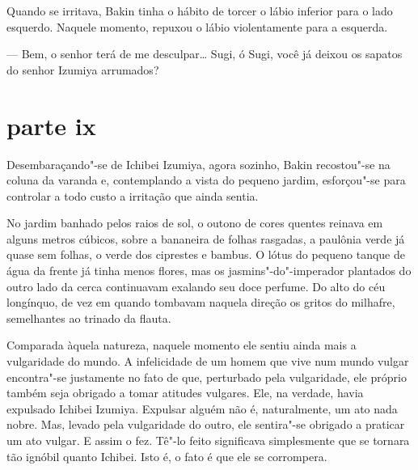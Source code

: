 Quando se irritava, Bakin tinha o hábito de torcer o lábio inferior para
o lado esquerdo. Naquele momento, repuxou o lábio violentamente para a
esquerda.

--- Bem, o senhor terá de me desculpar\ldots{} Sugi, ó Sugi, você já deixou
os sapatos do senhor Izumiya arrumados?

\section*{parte ix}

Desembaraçando"-se de Ichibei Izumiya, agora sozinho, Bakin recostou"-se
na coluna da varanda e, contemplando a vista do pequeno jardim,
esforçou"-se para controlar a todo custo a irritação que ainda sentia.

No jardim banhado pelos raios de sol, o outono de cores quentes reinava
em alguns metros cúbicos, sobre a bananeira de folhas rasgadas, a
paulônia verde já quase sem folhas, o verde dos ciprestes e bambus. O
lótus do pequeno tanque de água da frente já tinha menos flores, mas os
jasmins"-do"-imperador plantados do outro lado da cerca continuavam
exalando seu doce perfume. Do alto do céu longínquo, de vez em quando
tombavam naquela direção os gritos do milhafre, semelhantes ao trinado
da flauta.

Comparada àquela natureza, naquele momento ele sentiu ainda mais a 
vulgaridade do mundo. A infelicidade de um homem que vive num mundo
vulgar encontra"-se justamente no fato de que, perturbado pela
vulgaridade, ele próprio também seja obrigado a tomar atitudes
vulgares. Ele, na verdade, havia expulsado Ichibei Izumiya. Expulsar
alguém não é, naturalmente, um ato nada nobre. Mas, levado pela
vulgaridade do outro, ele sentira"-se obrigado a praticar um ato vulgar.
E assim o fez. Tê"-lo feito significava simplesmente que se tornara tão
ignóbil quanto Ichibei. Isto é, o fato é que ele se corrompera.

